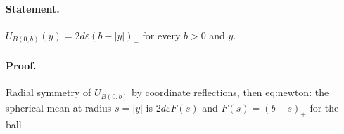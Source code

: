 \paragraph{Statement.} $U_{B(0,b)}(y)=2d\varepsilon(b-|y|)_+$ for every $b>0$ and $y$.
\paragraph{Proof.} Radial symmetry of $U_{B(0,b)}$ by coordinate reflections, then eq:newton: the spherical mean at radius $s=|y|$ is $2d\varepsilon F(s)$ and $F(s)=(b-s)_+$ for the ball.
